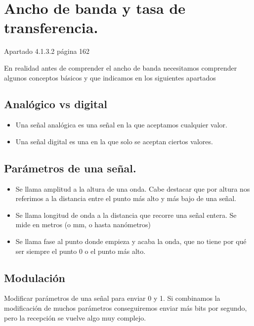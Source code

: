 \documentclass[letterpaper,10pt,spanish]{sphinxmanual}
\begin{document}
\section{Ancho de banda y tasa de transferencia.}
\label{\detokenize{t2_integracion_elementos/apuntes_t2:ancho-de-banda-y-tasa-de-transferencia}}
\sphinxAtStartPar
Apartado 4.1.3.2 página 162

\sphinxAtStartPar
En realidad antes de comprender el ancho de banda necesitamos comprender algunos conceptos básicos y que indicamos en los siguientes apartados


\subsection{Analógico vs digital}
\label{\detokenize{t2_integracion_elementos/apuntes_t2:analogico-vs-digital}}\begin{itemize}
\item {} 
\sphinxAtStartPar
Una señal analógica es una señal en la que aceptamos cualquier valor.

\item {} 
\sphinxAtStartPar
Una señal digital es una en la que solo se aceptan ciertos valores.

\end{itemize}


\subsection{Parámetros de una señal.}
\label{\detokenize{t2_integracion_elementos/apuntes_t2:parametros-de-una-senal}}\begin{itemize}
\item {} 
\sphinxAtStartPar
Se llama amplitud a la altura de una onda. Cabe destacar que por altura nos referimos a la distancia entre el punto más alto y más bajo de una señal.

\item {} 
\sphinxAtStartPar
Se llama longitud de onda a la distancia que recorre una señal entera. Se mide en metros (o mm, o hasta nanómetros)

\item {} 
\sphinxAtStartPar
Se llama fase al punto donde empieza y acaba la onda, que no tiene por qué ser siempre el punto 0 o el punto más alto.

\end{itemize}


\subsection{Modulación}
\label{\detokenize{t2_integracion_elementos/apuntes_t2:modulacion}}
\sphinxAtStartPar
Modificar parámetros de una señal para enviar 0 y 1. Si combinamos la modificación de muchos parámetros conseguiremos enviar más bits por segundo, pero la recepción se vuelve algo muy complejo.
\end{document}
